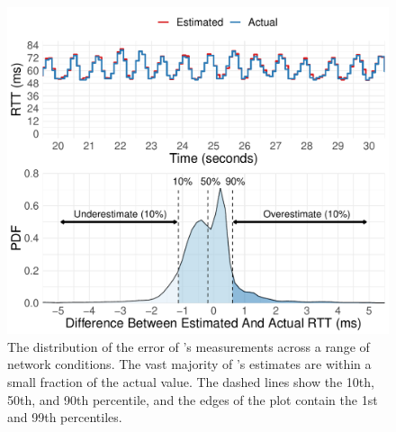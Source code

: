 \begin{figure}
    \centering
\begin{knitrout}
\color{fgcolor}
\includegraphics[width=\maxwidth]{figure/micro:time-delay-1} 

\end{knitrout}

    \caption{The distribution of the error of \name's measurements across a range of network conditions. The vast majority of \name's estimates are within a small fraction of the actual value. The dashed lines show the 10th, 50th, and 90th percentile, and the edges of the plot contain the 1st and 99th percentiles.}
    \label{fig:micro:time-delay}
\end{figure}
